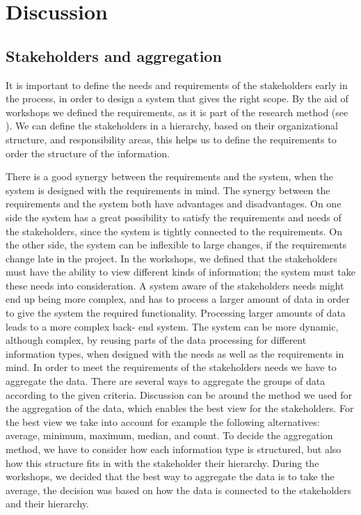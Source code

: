 \chapter{Discussion}
\label{chapter:discussion}

\section{Stakeholders and aggregation} %
\label{sec:discussion_stakeholders_and_aggregation}
It is important to define the needs and requirements of the stakeholders early 
in the process, in order to design a system that gives the right scope. By the 
aid of workshops we defined the requirements, as it is part of the research 
method (see ). We can define the stakeholders in a 
hierarchy, based on their organizational structure, and responsibility areas, 
this helps us to define the requirements to order the structure of the 
information.

There is a good synergy between the requirements and the system, when the 
system is designed with the requirements in mind. The synergy between the 
requirements and the system both have advantages and disadvantages. On one 
side the system has a great possibility to satisfy the requirements and needs 
of the stakeholders, since the system is tightly connected to the 
requirements. On the other side, the system can be inflexible to large 
changes, if the requirements change late in the project. In the workshops, we 
defined that the stakeholders must have the ability to view different kinds of 
information; the system must take these needs into consideration. A system 
aware of the stakeholders needs might end up being more complex, and has to 
process a larger amount of data in order to give the system the required 
functionality. Processing larger amounts of data leads to a more complex back-
end system. The system can be more dynamic, although complex, by reusing parts 
of the data processing for different information types, when designed with the 
needs as well as the requirements in mind. In order to meet the requirements 
of the stakeholders needs we have to aggregate the data. There are several 
ways to aggregate the groups of data according to the given criteria. 
Discussion can be around the method we used for the aggregation of the data, 
which enables the best view for the stakeholders. For the best view we take 
into account for example the following alternatives: average, minimum, 
maximum, median, and count. To decide the aggregation method, we have to 
consider how each information type is structured, but also how this structure 
fits in with the stakeholder their hierarchy. During the workshops, we decided 
that the best way to aggregate the data is to take the average, the decision 
was based on how the data is connected to the stakeholders and their
hierarchy.

